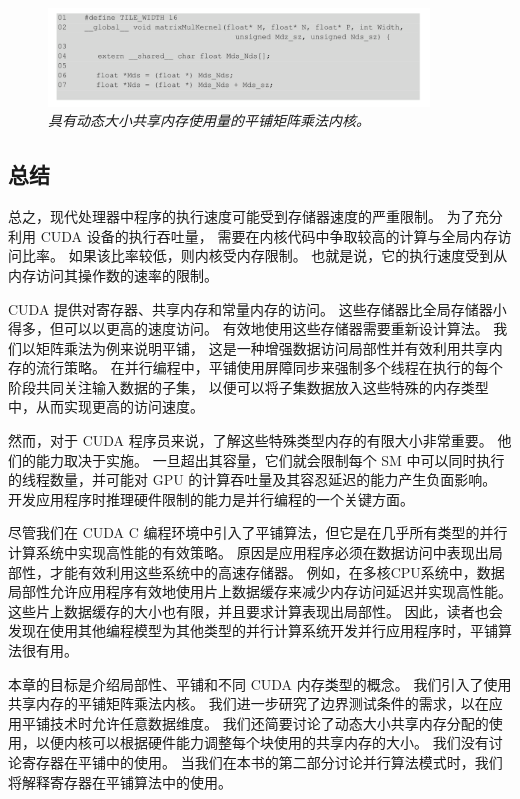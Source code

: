 \begin{figure}[H]
	\centering
	\includegraphics[width=0.9\textwidth]{figs/F5.14.png}
	\caption{\textit{具有动态大小共享内存使用量的平铺矩阵乘法内核。}}
\end{figure}

\subsection{总结}
总之，现代处理器中程序的执行速度可能受到存储器速度的严重限制。 为了充分利用 CUDA 设备的执行吞吐量，
需要在内核代码中争取较高的计算与全局内存访问比率。 如果该比率较低，则内核受内存限制。 
也就是说，它的执行速度受到从内存访问其操作数的速率的限制。

CUDA 提供对寄存器、共享内存和常量内存的访问。 这些存储器比全局存储器小得多，但可以以更高的速度访问。 
有效地使用这些存储器需要重新设计算法。 我们以矩阵乘法为例来说明平铺，
这是一种增强数据访问局部性并有效利用共享内存的流行策略。 
在并行编程中，平铺使用屏障同步来强制多个线程在执行的每个阶段共同关注输入数据的子集，
以便可以将子集数据放入这些特殊的内存类型中，从而实现更高的访问速度。

然而，对于 CUDA 程序员来说，了解这些特殊类型内存的有限大小非常重要。 他们的能力取决于实施。 
一旦超出其容量，它们就会限制每个 SM 中可以同时执行的线程数量，并可能对 GPU 的计算吞吐量及其容忍延迟的能力产生负面影响。 
开发应用程序时推理硬件限制的能力是并行编程的一个关键方面。

尽管我们在 CUDA C 编程环境中引入了平铺算法，但它是在几乎所有类型的并行计算系统中实现高性能的有效策略。 
原因是应用程序必须在数据访问中表现出局部性，才能有效利用这些系统中的高速存储器。 
例如，在多核CPU系统中，数据局部性允许应用程序有效地使用片上数据缓存来减少内存访问延迟并实现高性能。 
这些片上数据缓存的大小也有限，并且要求计算表现出局部性。 
因此，读者也会发现在使用其他编程模型为其他类型的并行计算系统开发并行应用程序时，平铺算法很有用。

本章的目标是介绍局部性、平铺和不同 CUDA 内存类型的概念。 我们引入了使用共享内存的平铺矩阵乘法内核。 
我们进一步研究了边界测试条件的需求，以在应用平铺技术时允许任意数据维度。 
我们还简要讨论了动态大小共享内存分配的使用，以便内核可以根据硬件能力调整每个块使用的共享内存的大小。 
我们没有讨论寄存器在平铺中的使用。 当我们在本书的第二部分讨论并行算法模式时，我们将解释寄存器在平铺算法中的使用。

